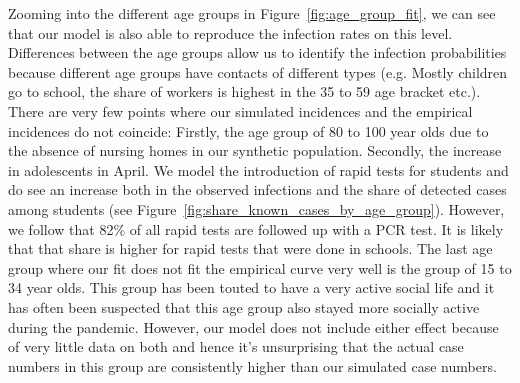 Zooming into the different age groups in Figure~\ref{fig:age_group_fit}, we can see that
our model is also able to reproduce the infection rates on this level. Differences
between the age groups allow us to identify the infection probabilities because different
age groups have contacts of different types (e.g. Mostly children go to school, the share
of workers is highest in the 35 to 59 age bracket etc.). There are very few points where
our simulated incidences and the empirical incidences do not
coincide: Firstly,
the age group of 80 to 100 year olds due to the absence of nursing homes in our synthetic
population. Secondly, the increase in adolescents in April. We model the introduction of
rapid tests for students and do see an increase both in the observed infections and the
share of detected cases among students (see
Figure~\ref{fig:share_known_cases_by_age_group}). However, we follow \cite{Betsch2021}
that 82\% of all rapid tests are followed up with a PCR test. It is likely that that
share is higher for rapid tests that were done in schools. The last age group where our
fit does not fit the empirical curve very well is the group of 15 to 34 year olds. This
group has been touted to have a very active social life and it has often been suspected
that this age group also stayed more socially active during the pandemic. However, our
model does not include either effect because of very little data on both and hence it's
unsurprising that the actual case numbers in this group are consistently higher than our
simulated case numbers.

